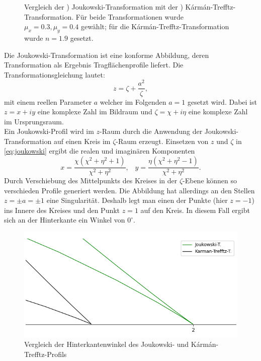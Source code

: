 \begin{figure}[]
\begin{subfigure}[b]{0.5\linewidth}
    \caption{\label{fig:karmantrefftztrans}}
  \end{subfigure}
  \caption{Vergleich der ) Joukowski-Transformation mit der ) Kármán-Trefftz-Transformation. Für beide Transformationen wurde $\mu_x = 0.3, \mu_y =0.4$ gewählt; für die Kármán-Trefftz-Transformation wurde $n=1.9$ gesetzt.\label{fig:joukar}}
\end{figure}
Die Joukowski-Transformation ist eine konforme Abbildung, deren Transformation als Ergebnis Tragflächenprofile liefert. Die Transformationsgleichung lautet:
\begin{equation}
\label{eq:joukowski}
z = \zeta + \frac{a^2}{\zeta},
\end{equation}
mit einem reellen Parameter $a$ welcher im Folgenden $a=1$ gesetzt wird. Dabei ist $z = x + iy$ eine komplexe Zahl im Bildraum und $\zeta = \chi + i \eta$ eine komplexe Zahl im Ursprungsraum. \\
Ein Joukowski-Profil wird im $z$-Raum durch die Anwendung der Joukowski-Transformation auf einen Kreis im $\zeta$-Raum erzeugt. Einsetzen von $z$ und $\zeta$ in \eqref{eq:joukowski} ergibt die realen und imaginären Komponenten
\begin{equation}
x={\frac {\chi \left(\chi ^{2}+\eta ^{2}+1\right)}{\chi ^{2}+\eta ^{2}}}, \;\;\; y={\frac {\eta \left(\chi ^{2}+\eta ^{2}-1\right)}{\chi ^{2}+\eta ^{2}}}.
\end{equation}
Durch Verschiebung des Mittelpunkts des Kreises in der $\zeta$-Ebene können so verschieden Profile generiert werden. Die Abbildung hat allerdings an den Stellen $z = \pm a = \pm 1$ eine Singularität. Deshalb legt man einen der Punkte (hier $z = -1$) ins Innere des Kreises und den Punkt $z=1$ auf den Kreis. In diesem Fall ergibt sich an der Hinterkante ein Winkel von $0^{\circ}$. \\
\begin{figure}[!ht]
\begin{center} \includegraphics[scale=0.5]{figures/zoomedjouk.png} \end{center}
\caption{Vergleich der Hinterkantenwinkel des Joukowski- und Kármán-Trefftz-Profils}
\label{fig:zoomedjouk}
\end{figure}
